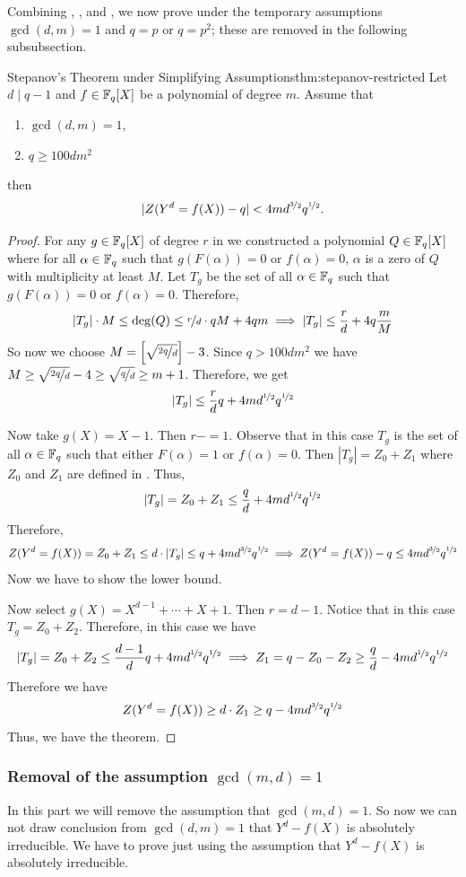 Combining \StepanovSolCountlem, \StepanovLinIndeplem, and \StepanovQExistslem, we now prove \Stepanov under the temporary assumptions $\gcd(d,m)=1$ and $q=p$ or $q=p^2$; these are removed in the following subsubsection.
\begin{Theorem}{Stepanov's Theorem under Simplifying Assumptions}{thm:stepanov-restricted}
  Let $d\mid q-1$ and $f\in \mathbb{F}_q[X]$ be a polynomial of degree $m$. Assume that \begin{enumerate}[label=(\roman*)]
    \item $\gcd(d,m)=1$, 
    \item $q\geq 100dm^2$
  \end{enumerate} then $$|Z(Y^d=f(X))-q|< 4md^{\nicefrac32}q^{\nicefrac12}.$$
\end{Theorem}
\begin{proof}
  For any $g\in\mathbb{F}_q[X]$ of degree $r$ in \StepanovQExistslem we constructed a polynomial $Q\in\mathbb{F}_q[X]$ where for all $\alpha\in\mathbb{F}_q$ such that $g(F(\alpha))=0$ or $f(\alpha)=0$, $\alpha$ is a zero of $Q$ with multiplicity at least $M$. Let $T_g $ be the set of all $\alpha\in\mathbb{F}_q$ such that $g(F(\alpha))=0$ or $f(\alpha)=0$. Therefore, $$|T_g|\cdot M\leq \deg (Q)\leq \nicefrac{r}{d}\cdot qM+4qm\implies |T_g|\leq \frac{r}d+4q\frac{m}{M}$$So now we choose $M=\left[\sqrt{\nicefrac{2q}d}\right]-3$. Since $q>100dm^2$ we have $M\geq \sqrt{\nicefrac{2q}d}-4\geq \sqrt{\nicefrac{q}d}\geq m+1$. Therefore, we get $$ |T_g|\leq \frac{r}{d}q+4md^{\nicefrac12}q^{\nicefrac12}$$

  Now take $g(X)=X-1$. Then $r-=1$. Observe that in this case $T_g$ is the set of all $\alpha\in\mathbb{F}_q$ such that either $F(\alpha)=1$ or $f(\alpha)=0$. Then $|T_g|=Z_0+Z_1$ where $Z_0$ and $Z_1$ are defined in \StepanovSolCountlem. Thus, $$|T_g|=Z_0+Z_1\leq \frac{q}{d}+4md^{\nicefrac12}q^{\nicefrac12}$$Therefore, $$Z(Y^d=f(X))=Z_0+Z_1\leq d\cdot |T_g|\leq q+4md^{\nicefrac32}q^{\nicefrac12}\implies Z(Y^d=f(X))-q\leq 4md^{\nicefrac32}q^{\nicefrac12}$$Now we have to show the lower bound. 

  Now select $g(X)=X^{d-1}+\cdots +X+1$. Then $r=d-1$. Notice that in this case $T_{g}=Z_0+Z_2$. Therefore, in this case we have $$|T_g|=Z_0+Z_2\leq \frac{d-1}{d}q+4md^{\nicefrac12}q^{\nicefrac12}\implies Z_1=q-Z_0-Z_2\geq \frac{q}d-4md^{\nicefrac12}q^{\nicefrac12}$$Therefore we have $$Z(Y^d=f(X))\geq d\cdot Z_1\geq q-4md^{\nicefrac32}q^{\nicefrac12}$$Thus, we have the theorem. 
\end{proof}
\subsubsection{Removal of the assumption \texorpdfstring{$\gcd(m,d)=1$}{gcd(m, d)=1}}
In this part we will remove the assumption that $\gcd(m,d)=1$. So now we can not draw conclusion from $\gcd(d,m)=1$ that $Y^d-f(X)$ is absolutely irreducible. We have to prove \StepanovRestrictedthm just using the assumption that $Y^d-f(X)$ is absolutely irreducible. 

